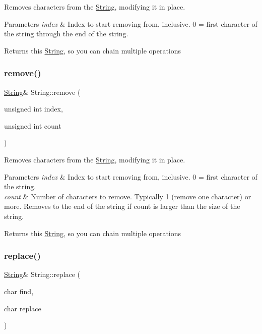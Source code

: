 Removes characters from the \hyperlink{class_string}{String}, modifying it in place. 


\begin{DoxyParams}{Parameters}
{\em index} & Index to start removing from, inclusive. 0 = first character of the string through the end of the string.\\
\hline
\end{DoxyParams}
\begin{DoxyReturn}{Returns}
this \hyperlink{class_string}{String}, so you can chain multiple operations 
\end{DoxyReturn}
\mbox{\label{class_string_ab27df1671530a95f2d8308fe179729e0}} 
\subsubsection{\texorpdfstring{remove()}{remove()}\hspace{0.1cm}{\footnotesize\ttfamily [2/2]}}
{\footnotesize\ttfamily \hyperlink{class_string}{String}\& String\+::remove (\begin{DoxyParamCaption}\item[{unsigned int}]{index,  }\item[{unsigned int}]{count }\end{DoxyParamCaption})}



Removes characters from the \hyperlink{class_string}{String}, modifying it in place. 


\begin{DoxyParams}{Parameters}
{\em index} & Index to start removing from, inclusive. 0 = first character of the string.\\
\hline
{\em count} & Number of characters to remove. Typically 1 (remove one character) or more. Removes to the end of the string if count is larger than the size of the string.\\
\hline
\end{DoxyParams}
\begin{DoxyReturn}{Returns}
this \hyperlink{class_string}{String}, so you can chain multiple operations 
\end{DoxyReturn}
\mbox{\label{class_string_a3452044f5ec9ffba3dcc3c2b355b769f}} 
\subsubsection{\texorpdfstring{replace()}{replace()}\hspace{0.1cm}{\footnotesize\ttfamily [1/2]}}
{\footnotesize\ttfamily \hyperlink{class_string}{String}\& String\+::replace (\begin{DoxyParamCaption}\item[{char}]{find,  }\item[{char}]{replace }\end{DoxyParamCaption})}



